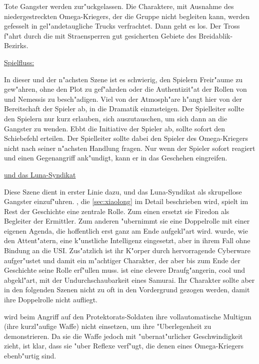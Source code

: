 Tote Gangster werden zur"uckgelassen. Die Charaktere, mit Ausnahme des niedergestreckten Omega-Kriegers, der die Gruppe nicht begleiten kann, werden gefesselt in gel"andetaugliche Trucks verfrachtet. Dann geht es los. Der Tross f"ahrt durch die mit Stra\3ensperren gut gesicherten Gebiete des Breidablik-Bezirks.

\vfill

\begin{remarks}
	\underline{Spielfluss:}

	In dieser und der n"achsten Szene ist es schwierig, den Spielern Freir"aume zu gew"ahren, ohne den Plot zu gef"ahrden oder die Authentizit"at der Rollen von \xl{} und Nemessis zu besch"adigen. Viel von der Atmosph"are h"angt hier von der Bereitschaft der Spieler ab, in die Dramatik einzusteigen. Der Spielleiter sollte den Spielern nur kurz erlauben, sich auszutauschen, um sich dann an die Gangster zu wenden. Ebbt die Initiative der Spieler ab, sollte \xl{} sofort den Schie\3befehl erteilen. Der Spielleiter sollte dabei den Spieler des Omega-Kriegers nicht nach seiner n"achsten Handlung fragen. Nur wenn der Spieler sofort reagiert und einen Gegenangriff ank"undigt, kann er in das Geschehen eingreifen.

	\underline{\xl{} und das Luna-Syndikat}

	Diese Szene dient in erster Linie dazu, \xl{} und das Luna-Syndikat als skrupellose Gangster einzuf"uhren. \xl{}, die  \cref{sec:xiaolong} im Detail beschrieben wird, spielt im Rest der Geschichte eine zentrale Rolle. Zum einen ersetzt sie Firedon als Begleiter der Ermittler. Zum anderen "ubernimmt sie eine Doppelrolle mit einer eigenen Agenda, die hoffentlich erst ganz am Ende aufgekl"art wird. \xl{} wurde, wie den Attent"atern, eine k"unstliche Intelligenz eingesetzt, aber in ihrem Fall ohne Bindung an die USI. Zus"atzlich ist ihr K"orper durch hervorragende Cyberware aufger"ustet und damit ein m"achtiger Charakter, der aber bis zum Ende der Geschichte seine Rolle erf"ullen muss. \xl{} ist eine clevere Draufg"angerin, cool und abgekl"art, mit der Undurchschaubarkeit eines Samurai. Ihr Charakter sollte aber in den folgenden Szenen nicht zu oft in den Vordergrund gezogen werden, damit ihre Doppelrolle nicht aufliegt.

	\xl{} wird beim Angriff auf den Protektorats-Soldaten ihre vollautomatische Multigun (ihre kurzl"aufige Waffe) nicht einsetzen, um ihre "Uberlegenheit zu demonstrieren. Da sie die Waffe jedoch mit "ubernat"urlicher Geschwindigkeit zieht, ist klar, dass sie "uber Reflexe verf"ugt, die denen eines Omega-Kriegers ebenb"urtig sind.


\end{remarks}
